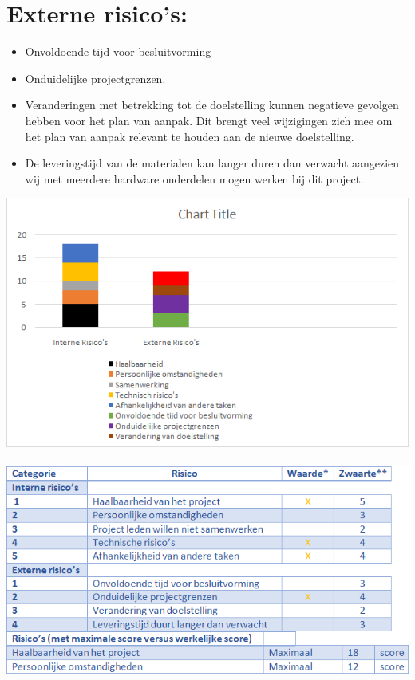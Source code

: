 \documentclass[oneside]{book}
\begin{document}
\section*{Externe risico's:}
\begin{itemize}
\item Onvoldoende tijd voor besluitvorming
\item Onduidelijke projectgrenzen. 
\item Veranderingen met betrekking tot de doelstelling kunnen negatieve gevolgen hebben voor het plan van aanpak. Dit brengt veel wijzigingen zich mee om het plan van aanpak relevant te houden aan de nieuwe doelstelling. 
\item De leveringstijd van de materialen kan langer duren dan verwacht aangezien wij met meerdere hardware onderdelen mogen werken bij dit project.   
\end{itemize} 
\includegraphics{graph.png}
\\
\\
\includegraphics[scale=0.75]{table.png}

\clearpage
\end{document}

